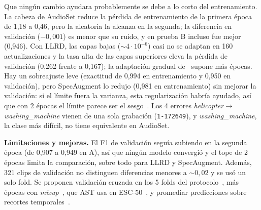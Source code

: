 \documentclass[letterpaper, 10 pt, conference]{ieeeconf}
\begin{document}
Que ningún cambio ayudara probablemente se debe a lo corto del entrenamiento. La cabeza de AudioSet reduce la pérdida de entrenamiento de la primera época de 1,18 a 0,46, pero la aleatoria la alcanza en la segunda; la diferencia en validación ($-0{,}001$) es menor que su ruido, y en prueba B incluso fue mejor (0,946). Con LLRD, las capas bajas ($\sim\!4\cdot10^{-6}$) casi no se adaptan en 160 actualizaciones y la tasa alta de las capas superiores eleva la pérdida de validación (0,262 frente a 0,167); la adaptación gradual de~\cite{ulmfit} supone más épocas. Hay un sobreajuste leve (exactitud de 0,994 en entrenamiento y 0,950 en validación), pero SpecAugment lo redujo (0,981 en entrenamiento) sin mejorar la validación: si el límite fuera la varianza, esta regularización habría ayudado, así que con 2 épocas el límite parece ser el sesgo~\cite{goodfellow}. Los 4 errores \textit{helicopter}$\rightarrow$\textit{washing\_machine} vienen de una sola grabación (\texttt{1-172649}), y \textit{washing\_machine}, la clase más difícil, no tiene equivalente en AudioSet.

\textbf{Limitaciones y mejoras.} El F1 de validación seguía subiendo en la segunda época (de 0,907 a 0,949 en A), así que ningún modelo convergió y el tope de 2 épocas limita la comparación, sobre todo para LLRD y SpecAugment. Además, 321 clips de validación no distinguen diferencias menores a $\sim\!0{,}02$ y se usó un solo fold. Se proponen validación cruzada en los 5 folds del protocolo~\cite{piczak}, más épocas con \textit{mixup}~\cite{mixup}, que AST usa en ESC-50~\cite{ast}, y promediar predicciones sobre recortes temporales~\cite{tta}.
\end{document}
